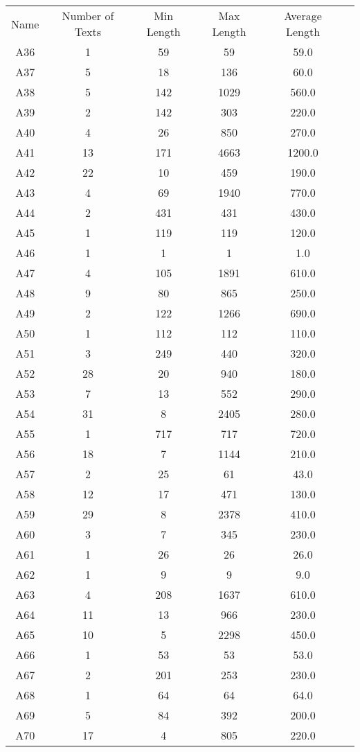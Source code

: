 \newpage
\begin{tabular}{cccccc}
 Name & Number of Texts & Min Length& Max Length & Average Length\\
A36 & 1 & 59 & 59 & 59.0\\
A37 & 5 & 18 & 136 & 60.0\\
A38 & 5 & 142 & 1029 & 560.0\\
A39 & 2 & 142 & 303 & 220.0\\
A40 & 4 & 26 & 850 & 270.0\\
A41 & 13 & 171 & 4663 & 1200.0\\
A42 & 22 & 10 & 459 & 190.0\\
A43 & 4 & 69 & 1940 & 770.0\\
A44 & 2 & 431 & 431 & 430.0\\
A45 & 1 & 119 & 119 & 120.0\\
A46 & 1 & 1 & 1 & 1.0\\
A47 & 4 & 105 & 1891 & 610.0\\
A48 & 9 & 80 & 865 & 250.0\\
A49 & 2 & 122 & 1266 & 690.0\\
A50 & 1 & 112 & 112 & 110.0\\
A51 & 3 & 249 & 440 & 320.0\\
A52 & 28 & 20 & 940 & 180.0\\
A53 & 7 & 13 & 552 & 290.0\\
A54 & 31 & 8 & 2405 & 280.0\\
A55 & 1 & 717 & 717 & 720.0\\
A56 & 18 & 7 & 1144 & 210.0\\
A57 & 2 & 25 & 61 & 43.0\\
A58 & 12 & 17 & 471 & 130.0\\
A59 & 29 & 8 & 2378 & 410.0\\
A60 & 3 & 7 & 345 & 230.0\\
A61 & 1 & 26 & 26 & 26.0\\
A62 & 1 & 9 & 9 & 9.0\\
A63 & 4 & 208 & 1637 & 610.0\\
A64 & 11 & 13 & 966 & 230.0\\
A65 & 10 & 5 & 2298 & 450.0\\
A66 & 1 & 53 & 53 & 53.0\\
A67 & 2 & 201 & 253 & 230.0\\
A68 & 1 & 64 & 64 & 64.0\\
A69 & 5 & 84 & 392 & 200.0\\
A70 & 17 & 4 & 805 & 220.0\\
\end{tabular}
